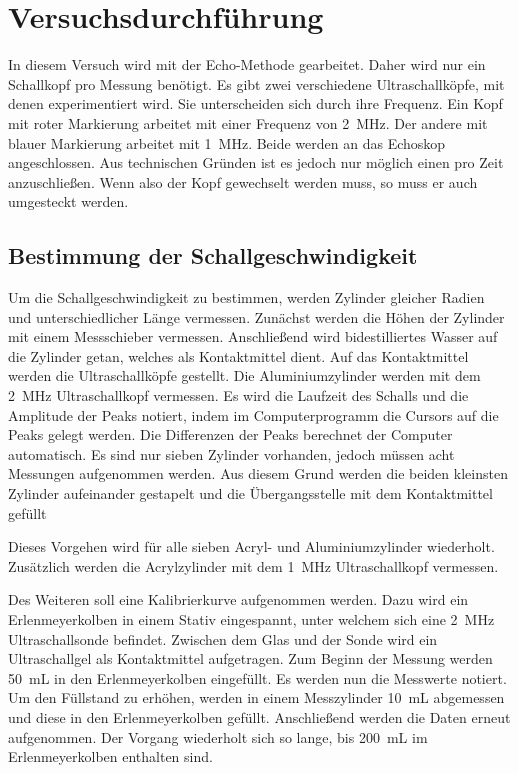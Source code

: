 %

%
\section{Versuchsdurchführung}

In diesem Versuch wird mit der Echo-Methode gearbeitet. Daher wird nur ein Schallkopf pro Messung benötigt.
Es gibt zwei verschiedene Ultraschallköpfe, mit denen experimentiert wird. Sie unterscheiden sich durch 
ihre Frequenz. Ein Kopf mit roter Markierung arbeitet mit einer Frequenz von \qty{2}{\mega \hertz}. Der 
andere mit blauer Markierung arbeitet mit \qty{1}{\mega \hertz}. Beide werden an das Echoskop angeschlossen.
Aus technischen Gründen ist es jedoch nur möglich einen pro Zeit anzuschließen. Wenn also der Kopf gewechselt 
werden muss, so muss er auch umgesteckt werden.

\subsection{Bestimmung der Schallgeschwindigkeit}

\noindent Um die Schallgeschwindigkeit zu bestimmen, werden Zylinder gleicher Radien und unterschiedlicher 
Länge vermessen. Zunächst werden die Höhen der Zylinder mit einem Messschieber vermessen.
Anschließend wird bidestilliertes Wasser auf die Zylinder getan, welches als Kontaktmittel dient. 
Auf das Kontaktmittel werden die Ultraschallköpfe gestellt. 
Die Aluminiumzylinder werden mit dem \qty{2}{\mega \hertz} Ultraschallkopf vermessen. Es wird die Laufzeit 
des Schalls und die Amplitude der Peaks notiert, indem im Computerprogramm die Cursors auf die Peaks gelegt werden.
Die Differenzen der Peaks berechnet der Computer automatisch.   
Es sind nur sieben Zylinder vorhanden, jedoch müssen acht Messungen aufgenommen werden. Aus diesem Grund werden 
die beiden kleinsten Zylinder aufeinander gestapelt und die Übergangsstelle mit dem Kontaktmittel gefüllt

\noindent Dieses Vorgehen wird für alle sieben Acryl- und Aluminiumzylinder wiederholt. Zusätzlich werden die Acrylzylinder 
mit dem \qty{1}{\mega \hertz} Ultraschallkopf vermessen.

\noindent Des Weiteren soll eine Kalibrierkurve aufgenommen werden. Dazu wird ein Erlenmeyerkolben in einem Stativ eingespannt,
unter welchem sich eine \qty{2}{\mega \hertz} Ultraschallsonde befindet. Zwischen dem Glas und der Sonde wird ein 
Ultraschallgel als Kontaktmittel aufgetragen. Zum Beginn der Messung werden \qty{50}{\milli \liter} in den 
Erlenmeyerkolben eingefüllt. Es werden nun die Messwerte notiert. Um den Füllstand zu erhöhen, werden in einem 
Messzylinder \qty{10}{\milli \liter} abgemessen und diese in den Erlenmeyerkolben gefüllt. Anschließend werden die 
Daten erneut aufgenommen. Der Vorgang wiederholt sich so lange, bis \qty{200}{\milli \liter} im Erlenmeyerkolben 
enthalten sind. 



